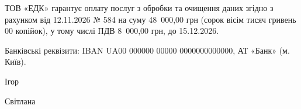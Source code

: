 \documentclass[14pt]{dstu4163}
\begin{document}

ТОВ «ЕДК» гарантує оплату послуг з обробки та очищення даних
згідно з рахунком від 12.11.2026 № 584 на суму 48~000,00 грн
(сорок вісім тисяч гривень 00 копійок), у тому числі ПДВ 8~000,00 грн,
до 15.12.2026.

Банківські реквізити: IBAN UA00 000000 00000 0000000000000,
АТ «Банк» (м. Київ).

\signature{Директор}{Ігор }
\signature[seal]{Головний бухгалтер}{Світлана }

\end{document}
